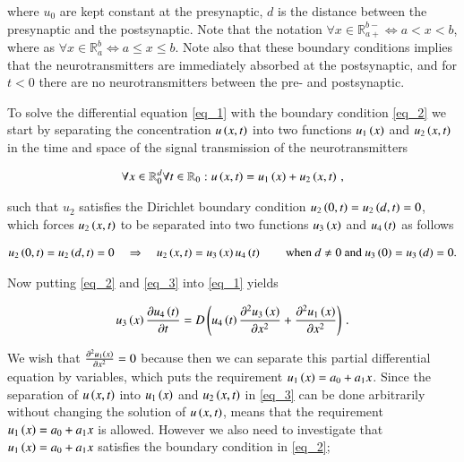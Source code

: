 \documentclass[11pt,english,a4paper]{article}
\begin{document}
\begin{flushleft}
where $u_0$ are kept constant at the presynaptic, $d$ is the distance between the presynaptic and the postsynaptic. Note that the notation $\forall x\in\mathbb{R}_{a+}^{b-} \Leftrightarrow a < x < b$, where as $\forall x\in\mathbb{R}_{a}^{b} \Leftrightarrow a \leq x \leq b$. Note also that these boundary conditions implies that the neurotransmitters are immediately absorbed at the postsynaptic, and for $t<0$ there are no neurotransmitters between the pre- and postsynaptic. \linebreak

To solve the differential equation \eqref{eq_1} with the boundary condition \eqref{eq_2} we start by separating the concentration $u\left({x,t}\right)$ into two functions $u_1\left({x}\right)$ and $u_2\left({x,t}\right)$ in the time and space of the signal transmission of the neurotransmitters

\begin{align}
\forall x \in \mathbb{R}_0^d \forall t \in \mathbb{R}_{0}: u\left({x,t}\right) = u_1\left({x}\right) + u_2\left({x,t}\right) \,,
\label{eq_3}
\end{align}

such that $u_2$ satisfies the Dirichlet boundary condition $u_2\left({0,t}\right)=u_2\left({d,t}\right)=0$, which forces $u_2\left({x,t}\right)$ to be separated into two functions $u_3\left({x}\right)$ and $u_4\left({t}\right)$ as follows

\begin{align}
u_2\left({0,t}\right) = u_2\left({d,t}\right) = 0 \quad \Rightarrow \quad u_2\left({x,t}\right) = u_3\left({x}\right)u_4\left({t}\right) \qquad \text{when $d\neq 0$ and $u_3\left({0}\right)=u_3\left({d}\right)=0$.}
\label{eq_4}
\end{align}

Now putting \eqref{eq_2} and \eqref{eq_3} into \eqref{eq_1} yields

\begin{align*}
u_3\left({x}\right)\frac{\partial u_4\left({t}\right)}{\partial t} = D\left({u_4\left({t}\right)\frac{\partial^2 u_3\left({x}\right)}{\partial x^2} + \frac{\partial^2 u_1\left({x}\right)}{\partial x^2}}\right) \,.
\end{align*}

We wish that $\frac{\partial^2 u_1\left({x}\right)}{\partial x^2} =0$ because then we can separate this partial differential equation by variables, which puts the requirement $u_1\left({x}\right) = a_0 + a_1 x$. Since the separation of $u\left({x,t}\right)$ into $u_1\left({x}\right)$ and $u_2\left({x,t}\right)$ in \eqref{eq_3} can be done arbitrarily without changing the solution of $u\left({x,t}\right)$, means that the requirement $u_1\left({x}\right) = a_0 + a_1 x$ is allowed. However we also need to investigate that $u_1\left({x}\right) = a_0 + a_1 x$ satisfies the boundary condition in \eqref{eq_2};


\end{flushleft}
\end{document}
